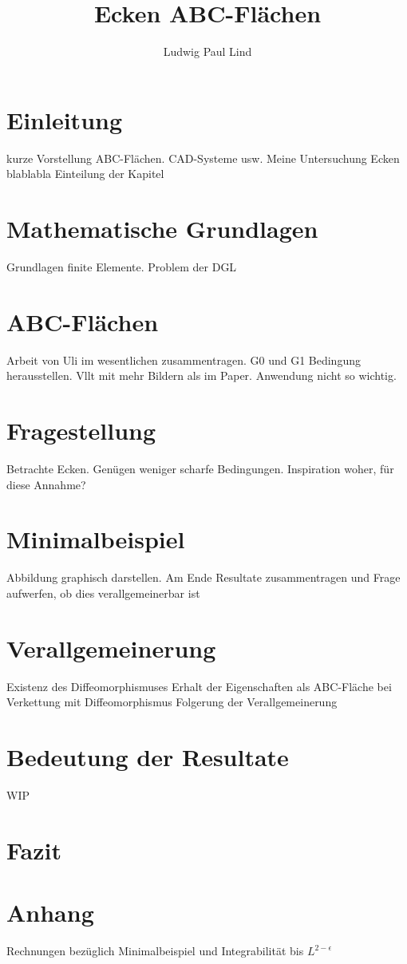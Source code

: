 \documentclass[10pt,a4paper,oneside]{report}
\author{Ludwig Paul Lind}
\title{Ecken ABC-Flächen}
\begin{document}
\maketitle
\tableofcontents

\chapter{Einleitung}
kurze Vorstellung ABC-Flächen. CAD-Systeme usw. 
Meine Untersuchung Ecken blablabla
Einteilung der Kapitel

\chapter{Mathematische Grundlagen}
Grundlagen finite Elemente.
Problem der DGL

\chapter{ABC-Flächen}
Arbeit von Uli im wesentlichen zusammentragen.
G0 und G1 Bedingung herausstellen. 
Vllt mit mehr Bildern als im Paper.
Anwendung nicht so wichtig.

\chapter{Fragestellung}
Betrachte Ecken. Genügen weniger scharfe Bedingungen. Inspiration woher, für diese Annahme?

\chapter{Minimalbeispiel}
Abbildung graphisch darstellen. 
Am Ende Resultate zusammentragen und Frage aufwerfen, ob dies verallgemeinerbar ist

\chapter{Verallgemeinerung}
Existenz des Diffeomorphismuses
Erhalt der Eigenschaften als ABC-Fläche bei Verkettung mit Diffeomorphismus
Folgerung der Verallgemeinerung

\chapter{Bedeutung der Resultate}
WIP

\chapter{Fazit}

\chapter{Anhang}
Rechnungen bezüglich Minimalbeispiel und Integrabilität bis $L^{2-\epsilon}$
\end{document}
